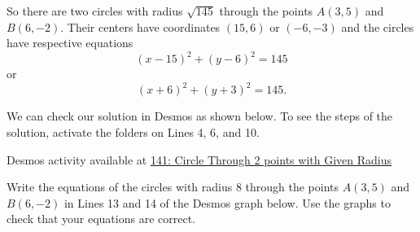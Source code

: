 \documentclass{ximera}
\begin{document}
\begin{example}
\begin{explanation}
So there are two circles with radius $\sqrt{145}$ through the points $A(3,5)$ and $B(6,-2)$. Their centers have coordinates $(15,6)$ or $(-6,-3)$ and the circles have respective equations
\[
     (x-15)^2 + (y-6)^2 = 145
\]
or
\[
       (x+6)^2 + (y+3)^2 = 145 .
\]


We can check our solution in Desmos as shown below. To see the steps of the solution, activate the folders on Lines 4, 6, and 10.


 
\begin{onlineOnly}
    \begin{center}
\end{center}
\end{onlineOnly}

Desmos activity available at \href{https://www.desmos.com/calculatorlr0w13phrh}{141: Circle Through 2 points with Given Radius}







\begin{exploration}\label{exp:circle6}
Write the equations of the circles with radius 8 through the points $A(3,5)$ and $B(6,-2)$ in Lines 13 and 14 of the Desmos graph below. Use the graphs to check that your equations are correct.
 
 
\begin{onlineOnly}
    \begin{center}
\end{center}
\end{onlineOnly}
\end{exploration}

\end{explanation}

\end{example}
\end{document}
